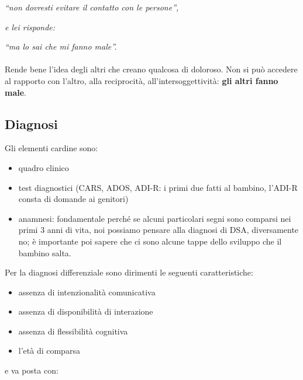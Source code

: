 \emph{``non dovresti evitare il contatto con le persone'', }

\emph{e lei risponde: }

\emph{``ma lo sai che mi fanno male''.}
\\\\
Rende bene l'idea degli altri che creano qualcosa di doloroso. Non si
può accedere al rapporto con l'altro, alla reciprocità,
all'intersoggettività: \textbf{gli altri fanno male}.

\subsection{Diagnosi}

Gli elementi cardine sono:

\begin{itemize}
\item
  quadro clinico
\item
  test diagnostici (CARS, ADOS, ADI-R: i primi due fatti al bambino,
  l'ADI-R consta di domande ai genitori)
\item
  anamnesi: fondamentale perché se alcuni particolari segni sono
  comparsi nei primi 3 anni di vita, noi possiamo pensare alla diagnosi
  di DSA, diversamente no; è importante poi sapere che ci sono alcune
  tappe dello sviluppo che il bambino salta.
\end{itemize}

Per la diagnosi differenziale sono dirimenti le seguenti
caratteristiche:

\begin{itemize}
\item
  assenza di intenzionalità comunicativa
\item
  assenza di disponibilità di interazione
\item
  assenza di flessibilità cognitiva
\item
  l'età di comparsa
\end{itemize}

e va posta con:

